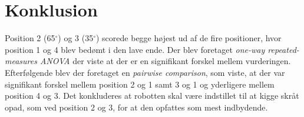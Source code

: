 \section*{Konklusion}
\label{Conlusion}

Position 2 (65$^{\circ}$) og 3 (35$^{\circ}$) scorede begge højest ud af de fire positioner, hvor position 1 og 4 blev bedømt i den lave ende. Der blev foretaget \textit{one-way repeated-measures ANOVA} der viste at der er en signifikant forskel mellem vurderingen. Efterfølgende blev der foretaget en \textit{pairwise comparison}, som viste, at der var signifikant forskel mellem position 2 og 1 samt 3 og 1 og yderligere mellem position 4 og 3. Det konkluderes at robotten skal være indstillet til at kigge skråt opad, som ved position 2 og 3, for at den opfattes som mest indbydende. 